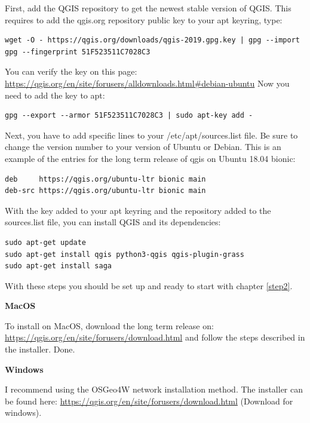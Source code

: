 \documentclass[12pt,a4paper]{scrartcl}
\begin{document}
First, add the QGIS repository to get the newest stable version of QGIS.
This requires to add the qgis.org repository public key to your apt keyring, type:

\begin{verbatim}
wget -O - https://qgis.org/downloads/qgis-2019.gpg.key | gpg --import
gpg --fingerprint 51F523511C7028C3
\end{verbatim}

You can verify the key on this page: \url{https://qgis.org/en/site/forusers/alldownloads.html\#debian-ubuntu}
Now you need to add the key to apt:  

\begin{verbatim}
gpg --export --armor 51F523511C7028C3 | sudo apt-key add -
\end{verbatim}

Next, you have to add specific lines to your /etc/apt/sources.list file.
Be sure to change the version number to your version of Ubuntu or Debian. \newline
This is an example of the entries for the long term release of qgis on Ubuntu 18.04 bionic:

\begin{verbatim}
deb     https://qgis.org/ubuntu-ltr bionic main
deb-src https://qgis.org/ubuntu-ltr bionic main
\end{verbatim}


With the key added to your apt keyring and the repository added to the sources.list file, you can install QGIS and its dependencies:  

\begin{verbatim}
sudo apt-get update
sudo apt-get install qgis python3-qgis qgis-plugin-grass
sudo apt-get install saga
\end{verbatim}

With these steps you should be set up and ready to start with chapter \ref{step2}. \newline

\textbf{MacOS} \newline

To install on MacOS, download the long term release on:
\url{https://qgis.org/en/site/forusers/download.html} and follow the steps described in the installer. Done.\newline

\textbf{Windows} \newline

I recommend using the OSGeo4W network installation method. \newline
The installer can be found here: \url{https://qgis.org/en/site/forusers/download.html} (Download for windows).
\end{document}
